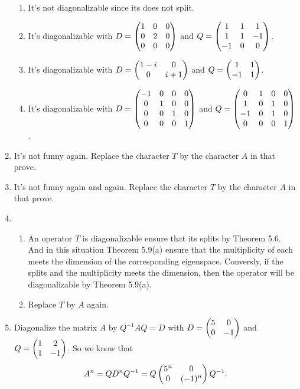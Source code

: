 \begin{enumerate}
\begin{enumerate}
\item It's not diagonalizable since its \charpoly{} does not split.
\item It's diagonalizable with $D=\begin{pmatrix}1 & 0 & 0\cr 0 & 2 & 0\cr 0 & 0 & 0\end{pmatrix}$ and $Q=\begin{pmatrix}1 & 1 & 1\cr 1 & 1 & -1\cr -1 & 0 & 0\end{pmatrix}$.
\item It's diagonalizable with $D=\begin{pmatrix}1-i & 0\cr 0 & i+1\end{pmatrix}$ and $Q=\begin{pmatrix}1 & 1\cr -1 & 1\end{pmatrix}$.
\item It's diagonalizable with $D=\begin{pmatrix}-1 & 0 & 0 & 0\cr 0 & 1 & 0 & 0\cr 0 & 0 & 1 & 0\cr 0 & 0 & 0 & 1\end{pmatrix}$ and $Q=\begin{pmatrix}0 & 1 & 0 & 0\cr 1 & 0 & 1 & 0\cr -1 & 0 & 1 & 0\cr 0 & 0 & 0 & 1\end{pmatrix}$.
\end{enumerate}
\item It's not funny again. Replace the character $T$ by the character $A$ in that prove.
\item It's not funny again and again. Replace the character $T$ by the character $A$ in that prove.
\item \begin{enumerate}
\item An operator $T$ is diagonalizable ensure that its \charpoly{} splits by Theorem 5.6. And in this situation Theorem 5.9(a) ensure that the multiplicity of each \egva{} meets the dimension of the corresponding eigenspace. Conversly, if the \charpoly{} splits and the multiplicity meets the dimension, then the operator will be diagonalizable by Theorem 5.9(a).
\item Replace $T$ by $A$ again.
\end{enumerate}
\item Diagonalize the matrix $A$ by $Q^{-1}AQ=D$ with $D=\begin{pmatrix}5 & 0\cr 0 & -1\end{pmatrix}$ and $Q=\begin{pmatrix}1 & 2\cr 1 & -1\end{pmatrix}$. So we know that 
\[A^n=QD^nQ^{-1}=Q\begin{pmatrix}5^n & 0\cr 0 & (-1)^n\end{pmatrix}Q^{-1}.\]

\end{enumerate}
